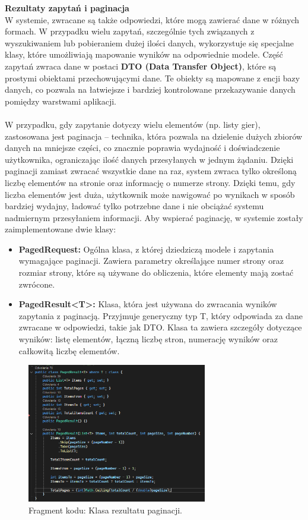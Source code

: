 \documentclass[12pt,a4paper]{article}
\begin{document}
\noindent \textbf{Rezultaty zapytań i paginacja}\\
W systemie, zwracane są także odpowiedzi, które mogą zawierać dane w różnych formach. W przypadku wielu zapytań, szczególnie tych związanych z wyszukiwaniem lub pobieraniem dużej ilości danych, wykorzystuje się specjalne klasy, które umożliwiają mapowanie wyników na odpowiednie modele. Część zapytań zwraca dane w postaci \textbf{DTO (Data Transfer Object)}, które są prostymi obiektami przechowującymi dane. Te obiekty są mapowane z encji bazy danych, co pozwala na łatwiejsze i bardziej kontrolowane przekazywanie danych pomiędzy warstwami aplikacji.
\\\\
W przypadku, gdy zapytanie dotyczy wielu elementów (np. listy gier), zastosowana jest paginacja – technika, która pozwala na dzielenie dużych zbiorów danych na mniejsze części, co znacznie poprawia wydajność i doświadczenie użytkownika, ograniczając ilość danych przesyłanych w jednym żądaniu. Dzięki paginacji zamiast zwracać wszystkie dane na raz, system zwraca tylko określoną liczbę elementów na stronie oraz informację o numerze strony. Dzięki temu, gdy liczba elementów jest duża, użytkownik może nawigować po wynikach w sposób bardziej wydajny, ładować tylko potrzebne dane i nie obciążać systemu nadmiernym przesyłaniem informacji. Aby wspierać paginację, w systemie zostały zaimplementowane dwie klasy:

\begin{itemize}
    \item \textbf{PagedRequest:} Ogólna klasa, z której dziedziczą modele i zapytania wymagające paginacji. Zawiera parametry określające numer strony oraz rozmiar strony, które są używane do obliczenia, które elementy mają zostać zwrócone.
    \item \textbf{PagedResult<T>:} Klasa, która jest używana do zwracania wyników zapytania z paginacją. Przyjmuje generyczny typ T, który odpowiada za dane zwracane w odpowiedzi, takie jak DTO. Klasa ta zawiera szczegóły dotyczące wyników: listę elementów, łączną liczbę stron, numerację wyników oraz całkowitą liczbę elementów.
\end{itemize}

\begin{figure}[h!]
    \centering
    \includegraphics[width=0.7\textwidth]{images/ex_pagination.png}
    \caption{Fragment kodu: Klasa rezultatu paginacji.}
\end{figure}
\end{document}
